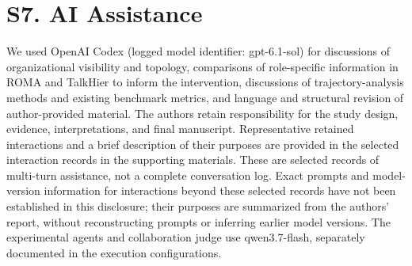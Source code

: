 \documentclass[10pt,letterpaper,twocolumn]{article}
\begin{document}
\section*{S7. AI Assistance}
We used OpenAI Codex (logged model identifier: gpt-6.1-sol) for discussions of organizational visibility and topology, comparisons of role-specific information in ROMA and TalkHier to inform the intervention, discussions of trajectory-analysis methods and existing benchmark metrics, and language and structural revision of author-provided material. The authors retain responsibility for the study design, evidence, interpretations, and final manuscript. Representative retained interactions and a brief description of their purposes are provided in the selected interaction records in the supporting materials. These are selected records of multi-turn assistance, not a complete conversation log. Exact prompts and model-version information for interactions beyond these selected records have not been established in this disclosure; their purposes are summarized from the authors' report, without reconstructing prompts or inferring earlier model versions. The experimental agents and collaboration judge use qwen3.7-flash, separately documented in the execution configurations.
\end{document}
